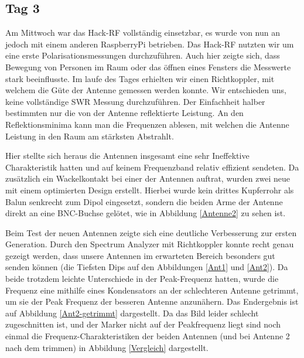 \documentclass[titlepage,11pt,a4paper,ngerman]{article}
\begin{document}
\subsection{Tag 3}

Am Mittwoch war das Hack-RF vollständig einsetzbar, es wurde von nun an jedoch mit einem anderen RaspberryPi betrieben. Das Hack-RF nutzten wir um eine erste Polarisationsmessungen durchzuführen. Auch hier zeigte sich, dass Bewegung von Personen im Raum oder das öffnen eines Fensters die Messwerte stark beeinflusste. Im laufe des Tages erhielten wir einen Richtkoppler, mit welchem die Güte der Antenne gemessen werden konnte. Wir entschieden uns, keine vollständige SWR Messung durchzuführen. Der Einfachheit halber bestimmten nur die von der Antenne reflektierte Leistung. An den Reflektionsminima kann man  die Frequenzen ablesen, mit welchen die Antenne  Leistung in den Raum am stärksten Abstrahlt. \par
Hier stellte sich heraus die Antennen insgesamt eine sehr Ineffektive Charakteristik hatten und auf keinem Frequenzband relativ effizient sendeten. Da zusätzlich ein Wackelkontakt bei einer der Antennen auftrat, wurden zwei neue mit einem optimierten Design erstellt. Hierbei wurde kein drittes Kupferrohr als Balun senkrecht zum Dipol eingesetzt, sondern die beiden Arme der Antenne direkt an eine BNC-Buchse gelötet, wie in Abbildung \ref{Antenne2} zu sehen ist.\par
Beim Test der neuen Antennen zeigte sich eine deutliche Verbesserung zur ersten Generation. Durch den Spectrum Analyzer mit Richtkoppler konnte recht genau gezeigt werden, dass unsere Antennen im erwarteten Bereich besonders gut senden können (die Tiefsten Dips auf den Abbildungen \ref{Ant1} und \ref{Ant2}). Da beide trotzdem leichte Unterschiede in der Peak-Frequenz hatten, wurde die Frequenz eine mithilfe eines Kondensators an der schlechteren Antenne getrimmt, um sie der Peak Frequenz der besseren Antenne anzunähern. Das Endergebnis ist auf Abbildung \ref{Ant2-getrimmt} dargestellt. Da das Bild leider schlecht zugeschnitten ist, und der Marker nicht auf der Peakfrequenz liegt sind noch einmal die Frequenz-Charakteristiken der beiden Antennen (und bei Antenne 2 nach dem trimmen) in Abbildung \ref{Vergleich} dargestellt.
\end{document}
